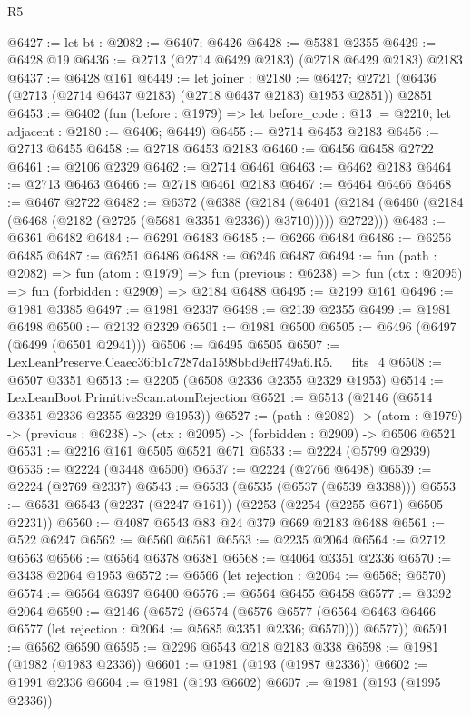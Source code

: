 \begin{lexlean}{R5}
\begin{coremodule}
@6427 := let bt : @2082 := @6407; @6426
@6428 := @5381 @2355
@6429 := @6428 @19
@6436 := @2713 (@2714 @6429 @2183) (@2718 @6429 @2183) @2183
@6437 := @6428 @161
@6449 := let joiner : @2180 := @6427;
  @2721 (@6436 (@2713 (@2714 @6437 @2183) (@2718 @6437 @2183) @1953 @2851)) @2851
@6453 := @6402
    (fun (before : @1979) => let before_code : @13 := @2210; let adjacent : @2180 := @6406; @6449)
@6455 := @2714 @6453 @2183
@6456 := @2713 @6455
@6458 := @2718 @6453 @2183
@6460 := @6456 @6458 @2722
@6461 := @2106 @2329
@6462 := @2714 @6461
@6463 := @6462 @2183
@6464 := @2713 @6463
@6466 := @2718 @6461 @2183
@6467 := @6464 @6466
@6468 := @6467 @2722
@6482 := @6372
    (@6388
      (@2184
        (@6401 (@2184 (@6460 (@2184 (@6468 (@2182 (@2725 (@5681 @3351 @2336)) @3710))))) @2722)))
@6483 := @6361 @6482
@6484 := @6291 @6483
@6485 := @6266 @6484
@6486 := @6256 @6485
@6487 := @6251 @6486
@6488 := @6246 @6487
@6494 := fun (path : @2082) =>
  fun (atom : @1979) =>
  fun (previous : @6238) => fun (ctx : @2095) => fun (forbidden : @2909) => @2184 @6488
@6495 := @2199 @161
@6496 := @1981 @3385
@6497 := @1981 @2337
@6498 := @2139 @2355
@6499 := @1981 @6498
@6500 := @2132 @2329
@6501 := @1981 @6500
@6505 := @6496 (@6497 (@6499 (@6501 @2941)))
@6506 := @6495 @6505
@6507 := LexLeanPreserve.Ceaec36fb1c7287da1598bbd9eff749a6.R5.__fits_4
@6508 := @6507 @3351
@6513 := @2205 (@6508 @2336 @2355 @2329 @1953)
@6514 := LexLeanBoot.PrimitiveScan.atomRejection
@6521 := @6513 (@2146 (@6514 @3351 @2336 @2355 @2329 @1953))
@6527 := (path : @2082) ->
  (atom : @1979) -> (previous : @6238) -> (ctx : @2095) -> (forbidden : @2909) -> @6506 @6521
@6531 := @2216 @161 @6505 @6521 @671
@6533 := @2224 (@5799 @2939)
@6535 := @2224 (@3448 @6500)
@6537 := @2224 (@2766 @6498)
@6539 := @2224 (@2769 @2337)
@6543 := @6533 (@6535 (@6537 (@6539 @3388)))
@6553 := @6531 @6543 (@2237 (@2247 @161)) (@2253 (@2254 (@2255 @671) @6505 @2231))
@6560 := @4087 @6543 @83 @24 @379 @669 @2183 @6488
@6561 := @522 @6247
@6562 := @6560 @6561
@6563 := @2235 @2064
@6564 := @2712 @6563
@6566 := @6564 @6378 @6381
@6568 := @4064 @3351 @2336
@6570 := @3438 @2064 @1953
@6572 := @6566 (let rejection : @2064 := @6568; @6570)
@6574 := @6564 @6397 @6400
@6576 := @6564 @6455 @6458
@6577 := @3392 @2064
@6590 := @2146
    (@6572
      (@6574
        (@6576 @6577 (@6564 @6463 @6466 @6577 (let rejection : @2064 := @5685 @3351 @2336; @6570)))
        @6577))
@6591 := @6562 @6590
@6595 := @2296 @6543 @218 @2183 @338
@6598 := @1981 (@1982 (@1983 @2336))
@6601 := @1981 (@193 (@1987 @2336))
@6602 := @1991 @2336
@6604 := @1981 (@193 @6602)
@6607 := @1981 (@193 (@1995 @2336))

\end{coremodule}
\end{lexlean}
